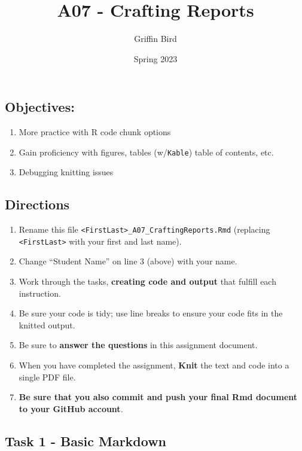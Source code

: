 \documentclass[
]{article}
\title{A07 - Crafting Reports}
\author{Griffin Bird}
\date{Spring 2023}
\providecommand{\tightlist}{%
  \setlength{\itemsep}{0pt}\setlength{\parskip}{0pt}}
\begin{document}
\maketitle

\hypertarget{objectives}{%
\subsection{Objectives:}\label{objectives}}

\begin{enumerate}
\def\labelenumi{\arabic{enumi}.}
\tightlist
\item
  More practice with R code chunk options
\item
  Gain proficiency with figures, tables (w/\texttt{Kable}) table of
  contents, etc.
\item
  Debugging knitting issues
\end{enumerate}

\hypertarget{directions}{%
\subsection{Directions}\label{directions}}

\begin{enumerate}
\def\labelenumi{\arabic{enumi}.}
\tightlist
\item
  Rename this file
  \texttt{\textless{}FirstLast\textgreater{}\_A07\_CraftingReports.Rmd}
  (replacing \texttt{\textless{}FirstLast\textgreater{}} with your first
  and last name).
\item
  Change ``Student Name'' on line 3 (above) with your name.
\item
  Work through the tasks, \textbf{creating code and output} that fulfill
  each instruction.
\item
  Be sure your code is tidy; use line breaks to ensure your code fits in
  the knitted output.
\item
  Be sure to \textbf{answer the questions} in this assignment document.
\item
  When you have completed the assignment, \textbf{Knit} the text and
  code into a single PDF file.
\item
  \textbf{Be sure that you also commit and push your final Rmd document
  to your GitHub account}.
\end{enumerate}

\hypertarget{task-1---basic-markdown}{%
\subsection{Task 1 - Basic Markdown}\label{task-1---basic-markdown}}
\end{document}
